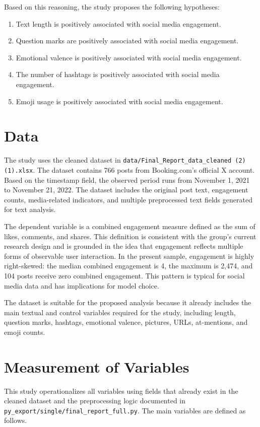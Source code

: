 \documentclass[12pt,a4paper,fontset=none]{ctexart}
\begin{document}
Based on this reasoning, the study proposes the following hypotheses:
\begin{enumerate}[label=H\arabic*.]
    \item Text length is positively associated with social media engagement.
    \item Question marks are positively associated with social media engagement.
    \item Emotional valence is positively associated with social media engagement.
    \item The number of hashtags is positively associated with social media engagement.
    \item Emoji usage is positively associated with social media engagement.
\end{enumerate}

\section{Data}
The study uses the cleaned dataset in \texttt{data/Final\_Report\_data\_cleaned (2) (1).xlsx}. The dataset contains 766 posts from Booking.com's official X account. Based on the timestamp field, the observed period runs from November 1, 2021 to November 21, 2022. The dataset includes the original post text, engagement counts, media-related indicators, and multiple preprocessed text fields generated for text analysis.

The dependent variable is a combined engagement measure defined as the sum of likes, comments, and shares. This definition is consistent with the group's current research design and is grounded in the idea that engagement reflects multiple forms of observable user interaction. In the present sample, engagement is highly right-skewed: the median combined engagement is 4, the maximum is 2,474, and 104 posts receive zero combined engagement. This pattern is typical for social media data and has implications for model choice.

The dataset is suitable for the proposed analysis because it already includes the main textual and control variables required for the study, including length, question marks, hashtags, emotional valence, pictures, URLs, at-mentions, and emoji counts.

\section{Measurement of Variables}
This study operationalizes all variables using fields that already exist in the cleaned dataset and the preprocessing logic documented in \texttt{py\_export/single/final\_report\_full.py}. The main variables are defined as follows.
\end{document}
